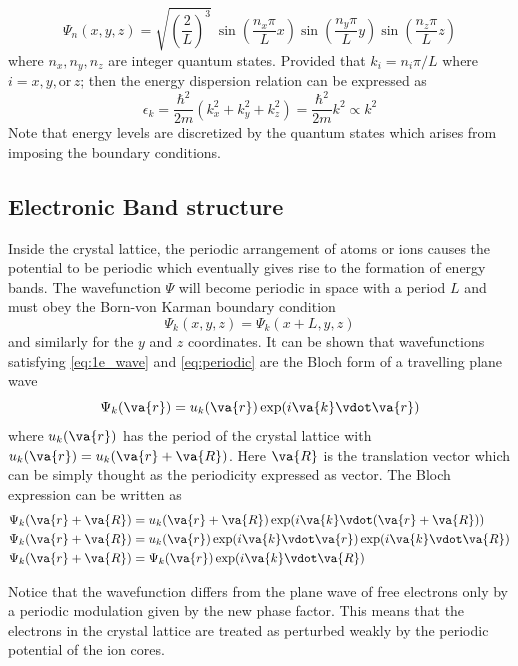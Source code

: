 \begin{equation}
	\Psi_n(x,y,z) = \sqrt{\left(\frac{2}{L}\right)^3} \ \sin(\frac{n_x \pi }{L} x) \sin(\frac{n_y \pi}{L} y) \sin(\frac{n_z \pi}{L} z)
\end{equation}
where $n_x,n_y,n_z$ are integer quantum states. Provided that $ k_i = n_i \pi / L$ where $i=x,y, \text{or}\, z$; then the energy dispersion relation can be expressed as 
\begin{equation} \label{eq:free_e}
    \epsilon_k = \frac{\hbar^2}{2m} (k_x^2 + k_y^2 + k_z^2) = \frac{\hbar^2}{2m} k^2 \propto k^2
\end{equation}
Note that energy levels are discretized by the quantum states which arises from imposing the boundary conditions. 
    \subsection{Electronic Band structure}
    Inside the crystal lattice, the periodic arrangement of atoms or ions causes the potential to be periodic which eventually gives rise to the formation of energy bands. The wavefunction $\Psi$ will become periodic in space with a period $L$ and must obey the Born-von Karman boundary condition \citep{Herman1959}
\begin{equation} \label{eq:periodic}
    \Psi_k(x,y,z) = \Psi_k(x + L, y, z) 
\end{equation}
and similarly for the $y$ and $z$ coordinates. It can be shown that wavefunctions satisfying \eqref{eq:1e_wave} and \eqref{eq:periodic} are the Bloch form of a travelling plane wave
\begin{equation} \label{eq:Bloch}
    \Psi_k(\va{r}) = u_k(\va{r}) \exp(i \va{k} \vdot \va{r})
\end{equation}  
where $u_k(\va{r})$ has the period of the crystal lattice with $u_k(\va{r}) = u_k(\va{r} + \va{R})$. Here $\va{R}$ is the translation vector which can be simply thought as the periodicity expressed as vector.  The Bloch expression can be written as
\begin{align}
    \Psi_k(\va{r} + \va{R}) &= u_k(\va{r} + \va{R}) \exp(i \va{k} \vdot (\va{r} + \va{R}))  \notag \\
    \Psi_k(\va{r} + \va{R}) &= u_k(\va{r}) \exp(i \va{k} \vdot \va{r})  \exp(i \va{k} \vdot \va{R}) \notag \\
    \Psi_k(\va{r} + \va{R}) &= \Psi_k(\va{r}) \exp(i \va{k} \vdot \va{R}) 
\end{align}

Notice that the wavefunction differs from the plane wave of free electrons only by a periodic modulation given by the new phase factor. This means that the electrons in the crystal lattice are treated as perturbed weakly by the periodic potential of the ion cores.

